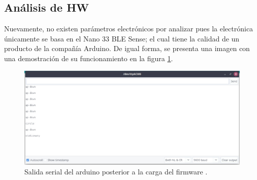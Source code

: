\subsection{Análisis de HW}
Nuevamente, no existen parámetros electrónicos por analizar pues la electrónica únicamente se basa en el Nano 33 BLE Sense; el cual tiene la calidad de un producto de la compañía Arduino. De igual forma, se presenta una imagen con una demostración de su funcionamiento en la figura \ref{f2}.
\begin{figure}[H]
\centering
\includegraphics[scale=0.6]{./images/ff.png} 
\caption{Salida serial del arduino posterior a la carga del firmware .}
\label{f2}
\end{figure}

